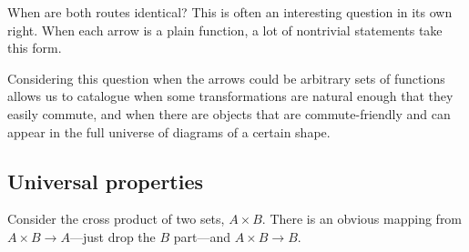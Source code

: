 \documentclass[11pt]{article}
\begin{document}
When are both routes identical? This is often an interesting question in its own right.
When each arrow is a plain function, a lot of nontrivial statements take this form.

Considering this question when the arrows could be arbitrary sets of functions allows
us to catalogue when some transformations are natural enough that they easily commute,
and when there are objects that are commute-friendly and can appear in the full universe
of diagrams of a certain shape.

\subsection{Universal properties}
Consider the cross product of two sets, $A\times B$. There is an obvious mapping from
$A\times B \to A$---just drop the $B$ part---and $A\times B \to B$.

\end{document}
